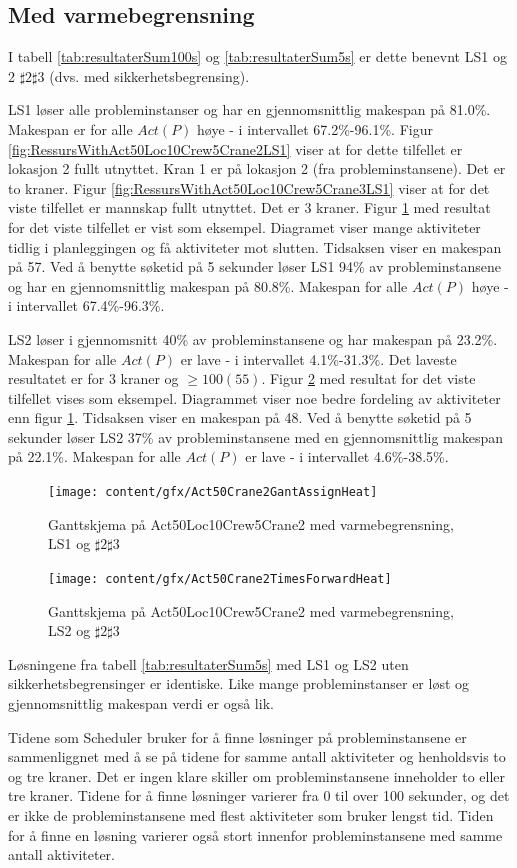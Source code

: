 \subsection{Med varmebegrensning}
I tabell \ref{tab:resultaterSum100s} og \ref{tab:resultaterSum5s} er dette benevnt LS1 og 2 $\sharp 2\sharp 3$ (dvs. med sikkerhetsbegrensing).

LS1 løser alle probleminstanser og har en gjennomsnittlig makespan på 81.0\%. Makespan er for alle $Act(P)$ høye - i intervallet 67.2\%-96.1\%. Figur \ref{fig:RessursWithAct50Loc10Crew5Crane2LS1} viser at for dette tilfellet er lokasjon 2 fullt utnyttet. Kran 1 er på lokasjon 2 (fra probleminstansene). Det er to kraner. Figur \ref{fig:RessursWithAct50Loc10Crew5Crane3LS1} viser at for det viste tilfellet er mannskap fullt utnyttet. Det er 3 kraner. Figur \ref{fig:GantWithAct50Loc10Crew5Crane2AssignHeat} med resultat for det viste tilfellet er vist som eksempel. Diagramet viser mange aktiviteter tidlig i planleggingen og få aktiviteter mot slutten. Tidsaksen viser en makespan på 57. Ved å benytte søketid på 5 sekunder løser LS1 94\% av probleminstansene og har en gjennomsnittlig makespan på 80.8\%. Makespan for alle $Act(P)$ høye - i intervallet 67.4\%-96.3\%.

LS2 løser i gjennomsnitt 40\% av probleminstansene og har makespan på 23.2\%. Makespan for alle $Act(P)$ er lave - i intervallet 4.1\%-31.3\%. Det laveste resultatet er for 3 kraner og $\ge 100(55)$. Figur \ref{fig:GantWithAct50Loc10Crew5Crane2TFHeat} med resultat for det viste tilfellet vises som eksempel. Diagrammet viser noe bedre fordeling av aktiviteter enn figur \ref{fig:GantWithAct50Loc10Crew5Crane2AssignHeat}. Tidsaksen viser en makespan på 48. Ved å benytte søketid på 5 sekunder løser LS2 37\% av probleminstansene med en gjennomsnittlig makespan på 22.1\%. Makespan for alle $Act(P)$ er lave - i intervallet 4.6\%-38.5\%.
\begin{figure}[!h]
\centering
\texttt{[image: content/gfx/Act50Crane2GantAssignHeat]}
\caption{Ganttskjema på Act50Loc10Crew5Crane2 med varmebegrensning, LS1 og $\sharp2\sharp3$}
\label{fig:GantWithAct50Loc10Crew5Crane2AssignHeat}
\end{figure}
\begin{figure}[!h]
\centering
\texttt{[image: content/gfx/Act50Crane2TimesForwardHeat]}
\caption{Ganttskjema på Act50Loc10Crew5Crane2 med varmebegrensning, LS2 og $\sharp2\sharp3$}
\label{fig:GantWithAct50Loc10Crew5Crane2TFHeat}
\end{figure}

Løsningene fra tabell \ref{tab:resultaterSum5s} med LS1 og LS2 uten sikkerhetsbegrensinger er identiske. Like mange probleminstanser er løst og gjennomsnittlig makespan verdi er også lik.

Tidene som Scheduler bruker for å finne løsninger på probleminstansene er sammenliggnet med å se på tidene for samme antall aktiviteter og henholdsvis to og tre kraner. Det er ingen klare skiller om probleminstansene inneholder to eller tre kraner. Tidene for å finne løsninger varierer fra 0 til over 100 sekunder, og det er ikke de probleminstansene med flest aktiviteter som bruker lengst tid. Tiden for å finne en løsning varierer også stort innenfor probleminstansene med samme antall aktiviteter.
